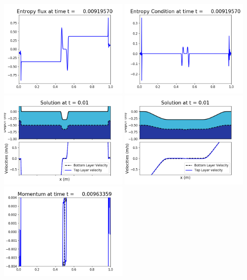 \documentclass[11pt]{article}
\begin{document}
\includegraphics[width=0.475\textwidth]{frame0022fig1008.png}
\vskip 10pt 
\includegraphics[width=0.475\textwidth]{frame0022fig1009.png}
\vskip 10pt 
\includegraphics[width=0.475\textwidth]{frame0023fig1001.png}
\includegraphics[width=0.475\textwidth]{frame0023fig1002.png}
\vskip 10pt 
\includegraphics[width=0.475\textwidth]{frame0023fig1003.png}
\end{document}
